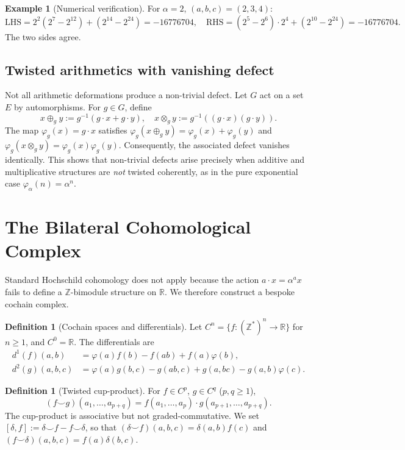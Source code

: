 \documentclass[11pt,a4paper]{article}
\theoremstyle{plain}
\theoremstyle{definition}
\newtheorem{definition}[theorem]{Definition}
\newtheorem{example}[theorem]{Example}
\theoremstyle{remark}
\newcommand{\ZZ}{\mathbb{Z}}
\newcommand{\RR}{\mathbb{R}}
\begin{document}
	\begin{example}[Numerical verification]
		For $\alpha=2$, $(a,b,c)=(2,3,4)$:
		\[
		\text{LHS}=2^2(2^7-2^{12})+(2^{14}-2^{24})=-16776704, \quad
		\text{RHS}=(2^5-2^6)\cdot2^4+(2^{10}-2^{24})=-16776704.
		\]
		The two sides agree.
	\end{example}
	
	\subsection{Twisted arithmetics with vanishing defect}
	\label{sec:twisted-vanishing}
	Not all arithmetic deformations produce a non-trivial defect. Let $G$ act on a set $E$ by automorphisms. For $g\in G$, define
	\[
	x \oplus_g y := g^{-1}(g\cdot x + g\cdot y), \quad x \otimes_g y := g^{-1}((g\cdot x)(g\cdot y)).
	\]
	The map $\varphi_g(x)=g\cdot x$ satisfies $\varphi_g(x\oplus_g y)=\varphi_g(x)+\varphi_g(y)$ and $\varphi_g(x\otimes_g y)=\varphi_g(x)\varphi_g(y)$. Consequently, the associated defect vanishes identically. This shows that non-trivial defects arise precisely when additive and multiplicative structures are \emph{not} twisted coherently, as in the pure exponential case $\varphi_\alpha(n)=\alpha^n$.
	
	\section{The Bilateral Cohomological Complex}
	\label{sec:complex}
	Standard Hochschild cohomology does not apply because the action $a\cdot x=\alpha^a x$ fails to define a $\ZZ$-bimodule structure on $\RR$. We therefore construct a bespoke cochain complex.
	
	\begin{definition}[Cochain spaces and differentials]
		\label{def:complex}
		Let $C^n=\{f:(\ZZ^*)^n\to\RR\}$ for $n\geq 1$, and $C^0=\RR$. The differentials are
		\begin{align*}
			d^1(f)(a,b)&=\varphi(a)f(b)-f(ab)+f(a)\varphi(b),\\
			d^2(g)(a,b,c)&=\varphi(a)g(b,c)-g(ab,c)+g(a,bc)-g(a,b)\varphi(c).
		\end{align*}
	\end{definition}
	
	\begin{definition}[Twisted cup-product]
		\label{def:cup}
		For $f\in C^p$, $g\in C^q$ ($p,q\geq 1$),
		\[
		(f\smile g)(a_1,\dots,a_{p+q})=f(a_1,\dots,a_p)\cdot g(a_{p+1},\dots,a_{p+q}).
		\]
		The cup-product is associative but not graded-commutative. We set $[\delta,f]:=\delta\smile f-f\smile\delta$, so that $(\delta\smile f)(a,b,c)=\delta(a,b)f(c)$ and $(f\smile\delta)(a,b,c)=f(a)\delta(b,c)$.
	\end{definition}
	
\end{document}
